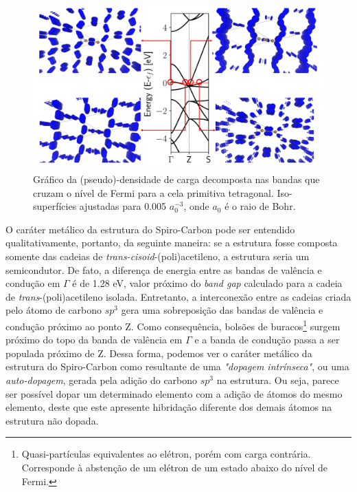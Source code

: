 	\begin{figure}[!ht]
		\centering
		\includegraphics[width=1\linewidth]{capitulos/fig/results1/bands_fermi}
		\caption{Gráfico da (pseudo)-densidade de carga decomposta nas bandas que cruzam o nível de Fermi para a cela primitiva tetragonal. Iso-superfícies ajustadas para 0.005 $a_0^{-3}$, onde $a_0$ é o raio de Bohr.}
		\label{bandas_fermi}
	\end{figure}

	O caráter metálico da estrutura do Spiro-Carbon pode ser entendido qualitativamente, portanto, da seguinte maneira: se a estrutura fosse composta somente das cadeias de \textit{trans-cisoid}-(poli)acetileno, a estrutura seria um semicondutor. De fato, a diferença de energia entre as bandas de valência e condução em $\Gamma$ é de 1.28 eV, valor próximo do \textit{band gap} calculado para a cadeia de \textit{trans}-(poli)acetileno isolada. Entretanto, a interconexão entre as cadeias criada pelo átomo de carbono $sp^3$ gera uma sobreposição das bandas de valência e condução próximo ao ponto Z. Como consequência, bolsões de buracos\footnote{Quasi-partículas equivalentes ao elétron, porém com carga contrária. Corresponde à abstenção de um elétron de um estado abaixo do nível de Fermi.} surgem próximo do topo da banda de valência em $\Gamma$ e a banda de condução passa a ser populada próximo de Z. Dessa forma, podemos ver o caráter metálico da estrutura do Spiro-Carbon como resultante de uma \textit{"dopagem intrínseca"}, ou uma \textit{auto-dopagem}, gerada pela adição do carbono $sp^3$ na estrutura. Ou seja, parece ser possível dopar um determinado elemento com a adição de átomos do mesmo elemento, deste que este apresente hibridação diferente dos demais átomos na estrutura não dopada.    
		
